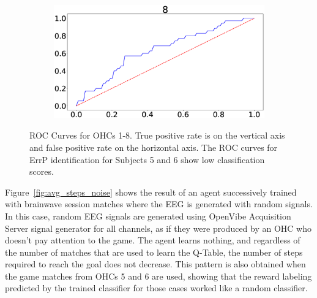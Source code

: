 \documentclass[journal]{IEEEtran}
\begin{document}
{{\begin{figure}[h!]
\begin{subfigure}{0.5\textwidth}
  \includegraphics[scale=0.09]{revisedimages/roc_8.eps} \\
\end{subfigure}
\caption{ROC Curves for OHCs 1-8. True positive rate is on the vertical axis and false positive rate on the horizontal axis.  The ROC curves for ErrP identification for Subjects 5 and 6 show low classification scores.}
\label{fig:rocsubjects}
\end{figure}


Figure~\ref{fig:avg_steps_noise} shows the result of an agent successively trained with brainwave session matches where the EEG is generated with random signals.  In this case, random EEG signals are generated using OpenVibe Acquisition Server signal generator for all channels, as if they were produced by an OHC who doesn't pay attention to the game.  The agent learns nothing, and regardless of the number of matches that are used to learn the Q-Table, the number of steps required to reach the goal does not decrease.  This pattern is also obtained when the game matches from OHCs 5 and 6 are used, showing that the reward labeling predicted by the trained classifier for those cases worked like a random classifier.

}}
\end{document}

